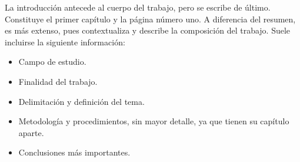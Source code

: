 La introducción antecede al cuerpo del trabajo, pero se escribe de último. Constituye el primer capítulo y la página número uno. A diferencia del resumen, es más extenso, pues contextualiza y describe la composición del trabajo. Suele incluirse la siguiente información:

\begin{itemize}
    \item Campo de estudio.

    \item Finalidad del trabajo.

    \item Delimitación y definición del tema.

    \item Metodología y procedimientos, sin mayor detalle, ya que tienen su capítulo aparte.

    \item Conclusiones más importantes.
    
\end{itemize}

      

      

      

      

      
